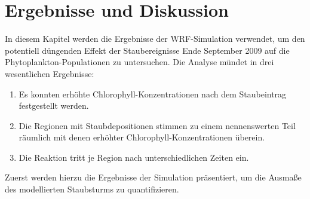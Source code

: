 \documentclass[12pt,a4paper,onecolumn,headheight=30pt]{scrartcl}
\begin{document}
\section{Ergebnisse und Diskussion} \label{sec:auswertung}
In diesem Kapitel werden die Ergebnisse der WRF-Simulation verwendet, um den potentiell düngenden Effekt der Staubereignisse Ende September 2009 auf die Phytoplankton-Populationen zu untersuchen. Die Analyse mündet in drei wesentlichen Ergebnisse:
\begin{enumerate}
\item Es konnten erhöhte Chlorophyll-Konzentrationen nach dem Staubeintrag festgestellt werden.
\item Die Regionen mit Staubdepositionen stimmen zu einem nennenswerten Teil räumlich mit denen erhöhter Chlorophyll-Konzentrationen überein.
\item Die Reaktion tritt je Region nach unterschiedlichen Zeiten ein.
\end{enumerate}
Zuerst werden hierzu die Ergebnisse der Simulation präsentiert, um die Ausmaße des modellierten Staubsturms zu quantifizieren. 
\end{document}
